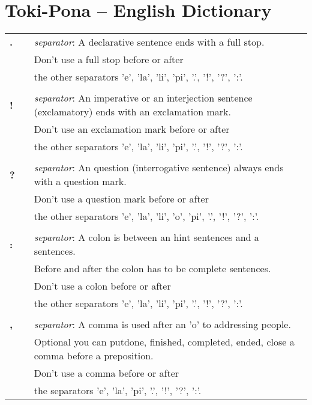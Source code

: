 \section{Toki-Pona -- English Dictionary}
\label{'dict'}
%
\begin{supertabular}{p{2,5cm}|ll}
\textbf{.} && \textit{separator}: A declarative sentence ends with a full stop. \\ && Don't use a full stop before or after \\ && the other separators 'e', 'la', 'li', 'pi', '.', '!', '?', ':'. \\ 
 && \\ %
\textbf{!} && \textit{separator}: An imperative or an interjection sentence (exclamatory) ends with an exclamation mark. \\ && Don't use an exclamation mark before or after \\ && the other separators 'e', 'la', 'li', 'pi', '.', '!', '?', ':'.  \\ 
 && \\ %
\textbf{?} && \textit{separator}: An question (interrogative sentence) always ends with a question mark. \\ && Don't use a question mark before or after \\ && the other separators 'e', 'la', 'li', 'o', 'pi', '.', '!', '?', ':'. \\
 && \\ %
\textbf{:} && \textit{separator}: A colon is between an hint sentences and a sentences. \\  && Before and after the colon has to be complete sentences.  \\  && Don't use a colon before or after \\ && the other separators 'e', 'la', 'li', 'pi', '.', '!', '?', ':'.   \\ 
 && \\ %
\textbf{,} && \textit{separator}: A comma is used after an 'o' to addressing people. \\ &&  Optional you can putdone, finished, completed, ended, close a comma before a preposition. \\ && Don't use a comma before or after \\ && the separators 'e', 'la', 'pi', '.', '!', '?', ':'.  \\ 

\end{supertabular}
